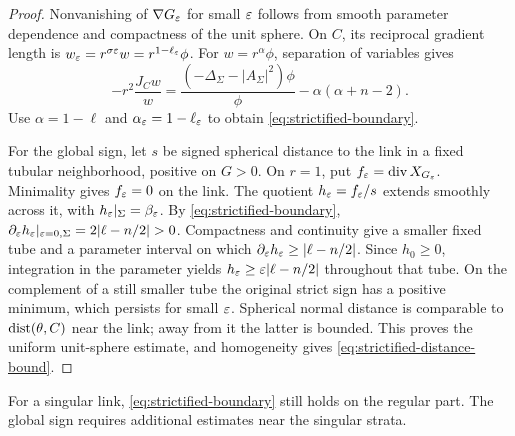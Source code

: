 \begin{proof}
Nonvanishing of \(\nabla G_\varepsilon\) for small \(\varepsilon\) follows from smooth
parameter dependence and compactness of the unit sphere.
On \(C\), its reciprocal gradient length is
\(w_\varepsilon=r^{\sigma\varepsilon}w=r^{1-\ell_\varepsilon}\phi\).
For \(w=r^\alpha\phi\), separation of variables gives
\[
 -r^2\frac{J_Cw}{w}
 =\frac{(-\Delta_\Sigma-|A_\Sigma|^2)\phi}{\phi}
                  -\alpha(\alpha+n-2).
\]
Use \(\alpha=1-\ell\) and \(\alpha_\varepsilon=1-\ell_\varepsilon\) to obtain
\eqref{eq:strictified-boundary}.

For the global sign, let \(s\) be signed spherical distance to the link
in a fixed tubular neighborhood, positive on \(G>0\).  On \(r=1\), put
\(f_\varepsilon=\operatorname{div} X_{G_\varepsilon}\).
Minimality gives \(f_\varepsilon=0\) on the link.  The quotient
\(h_\varepsilon=f_\varepsilon/s\) extends smoothly across it, with
\(h_\varepsilon|_\Sigma=\beta_\varepsilon\).
By \eqref{eq:strictified-boundary},
\(\partial_\eps h_\eps|_{\eps=0,\Sigma}=2|\ell-n/2|>0\).
Compactness and continuity give a smaller fixed tube and a parameter
interval on which \(\partial_\varepsilon h_\varepsilon\geq|\ell-n/2|\).
Since \(h_0\geq0\), integration in the parameter yields
\(h_\varepsilon\geq\varepsilon|\ell-n/2|\) throughout that tube.
On the complement of a still smaller tube the original strict sign has a
positive minimum, which persists for small \(\varepsilon\).
Spherical normal distance is comparable to \(\operatorname{dist}(\theta,C)\) near the
link; away from it the latter is bounded.  This proves the uniform
unit-sphere estimate, and homogeneity gives
\eqref{eq:strictified-distance-bound}.
\end{proof}

For a singular link,
\eqref{eq:strictified-boundary} still holds on the regular part.
The global sign requires additional estimates near the singular strata.


